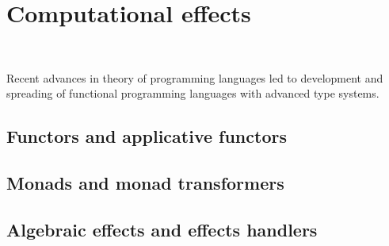 \chapter{Computational effects}
~\label{cpt-effects}


  Recent advances in theory of programming languages led to development and spreading
  of functional programming languages with advanced type systems.

  \section{Functors and applicative functors}

  \section{Monads and monad transformers}

  \section{Algebraic effects and effects handlers}